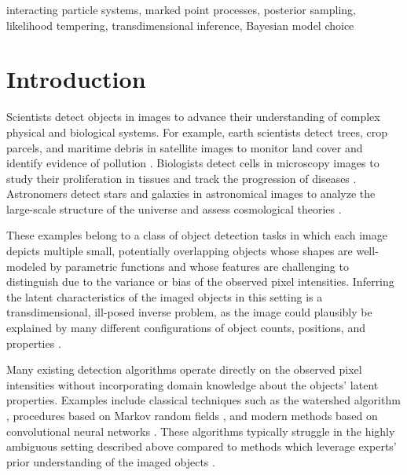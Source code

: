 \documentclass[
  12pt]{article}
\begin{document}
 interacting particle systems, marked point processes, posterior sampling, likelihood tempering, transdimensional inference, Bayesian model choice
\vfill

\newpage
{} %

\section{Introduction} \label{smc:introduction}

Scientists detect objects in images to advance their understanding of complex physical and biological systems. For example, earth scientists detect trees, crop parcels, and maritime debris in satellite images to monitor land cover and identify evidence of pollution \citep{graesser2017detection, brandt2020unexpectedly, basu2021development, yang2022deep}. Biologists detect cells in microscopy images to study their proliferation in tissues and track the progression of diseases \citep{wollman2007, usaj2016}. Astronomers detect stars and galaxies in astronomical images to analyze the large-scale structure of the universe and assess cosmological theories \citep{sevilla2021dark, abdurro2022seventeenth}.

These examples belong to a class of object detection tasks in which each image depicts multiple small, potentially overlapping objects whose shapes are well-modeled by parametric functions and whose features are challenging to distinguish due to the variance or bias of the observed pixel intensities. Inferring the latent characteristics of the imaged objects in this setting is a transdimensional, ill-posed inverse problem, as the image could plausibly be explained by many different configurations of object counts, positions, and properties \citep{dashti2013bayesian}.

Many existing detection algorithms operate directly on the observed pixel intensities without incorporating domain knowledge about the objects' latent properties. Examples include classical techniques such as the watershed algorithm \citep{szeliski2022computer}, procedures based on Markov random fields \citep{li1994markov, quattoni2004conditional}, and modern methods based on convolutional neural networks \citep{redmon2016yolo, he2017maskrcnn}. These algorithms typically struggle in the highly ambiguous setting described above compared to methods which leverage experts' prior understanding of the imaged objects \citep{cootes1995active, he2011object}.
\end{document}
